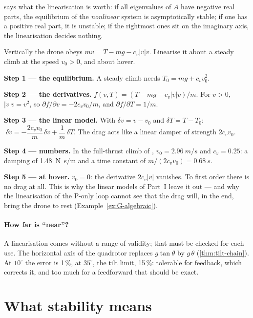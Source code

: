  says what the linearisation is worth: if all eigenvalues of $A$ have negative real parts, the equilibrium of the \emph{nonlinear} system is asymptotically stable; if one has a positive real part, it is unstable; if the rightmost ones sit on the imaginary axis, the linearisation decides nothing.

\begin{example}
\label{ex:G-drag}
Vertically the drone obeys $m\dot v = T - mg - c_v|v|v$. Linearise it about a steady climb at the speed $v_0 > 0$, and about hover.

\textbf{Step 1 — the equilibrium.} A steady climb needs $T_0 = mg + c_vv_0^2$.

\textbf{Step 2 — the derivatives.} $f(v, T) = (T - mg - c_v|v|v)/m$. For $v > 0$, $|v|v = v^2$, so $\partial f/\partial v = -2c_vv_0/m$, and $\partial f/\partial T = 1/m$.

\textbf{Step 3 — the linear model.} With $\delta v = v - v_0$ and $\delta T = T - T_0$: $\;\delta\dot v = -\dfrac{2c_vv_0}{m}\,\delta v + \dfrac{1}{m}\,\delta T$. The drag acts like a linear damper of strength $2c_vv_0$.

\textbf{Step 4 — numbers.} In the full-thrust climb of , $v_0 = \SI{2.96}{m/s}$ and $c_v = 0.25$: a damping of \SI{1.48}{N.s/m} and a time constant of $m/(2c_vv_0) = \SI{0.68}{s}$.

\textbf{Step 5 — at hover.} $v_0 = 0$: the derivative $2c_v|v|$ vanishes. To first order there is no drag at all. This is why the linear models of Part~I leave it out — and why the linearisation of the P-only loop cannot see that the drag will, in the end, bring the drone to rest (Example~\ref{ex:G-algebraic}).
\end{example}

\paragraph{How far is \enquote{near}?} A linearisation comes without a range of validity; that must be checked for each use. The horizontal axis of the quadrotor replaces $g\tan\theta$ by $g\,\theta$ (\cref{thm:tilt-chain}). At $10^\circ$ the error is 1\,\%, at $35^\circ$, the tilt limit, 15\,\%: tolerable for feedback, which corrects it, and too much for a feedforward that should be exact.

\section{What stability means}

